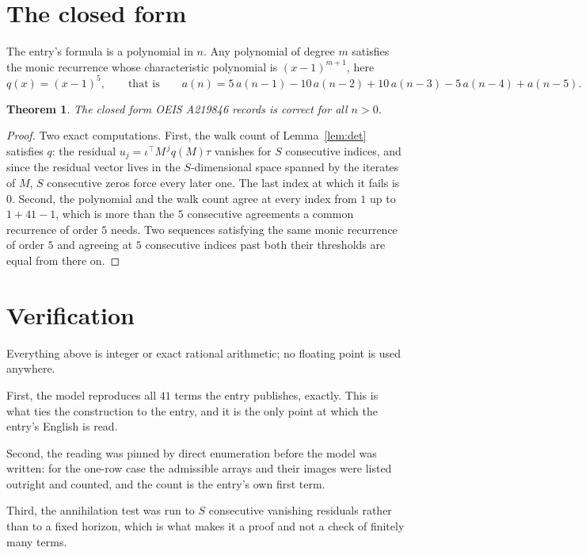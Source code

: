 \documentclass[11pt,a4paper]{article}
\theoremstyle{plain}
\newtheorem{theorem}{Theorem}
\theoremstyle{definition}
\begin{document}
\section{The closed form}

The entry's formula is a polynomial in $n$. Any polynomial of degree $m$ satisfies the monic
recurrence whose characteristic polynomial is $(x-1)^{m+1}$, here
\[
q(x)=(x-1)^{5},\qquad\text{that is}\qquad a(n)=5\,a(n-1) - 10\,a(n-2) + 10\,a(n-3) - 5\,a(n-4) + a(n-5).
\]

\begin{theorem}
The closed form OEIS A219846 records is correct for all $n>0$.
\end{theorem}

\begin{proof}
Two exact computations. First, the walk count of Lemma~\ref{lem:det} satisfies $q$: the
residual $u_j=\iota^{\!\top}M^{\,j}q(M)\tau$ vanishes for $S$ consecutive indices, and
since the residual vector lives in the $S$-dimensional space spanned by the iterates of $M$,
$S$ consecutive zeros force every later one. The last index at which it fails is $0$.
Second, the polynomial and the walk count agree at every index from $1$ up to
$1 + 41 - 1$, which is more than the $5$ consecutive agreements a
common recurrence of order $5$ needs. Two sequences satisfying the same monic recurrence
of order $5$ and agreeing at $5$ consecutive indices past both their thresholds are
equal from there on.
\end{proof}

\section{Verification}

Everything above is integer or exact rational arithmetic; no floating point is used anywhere.

First, the model reproduces all $41$ terms the entry publishes, exactly. This is what
ties the construction to the entry, and it is the only point at which the entry's English is
read.

Second, the reading was pinned by direct enumeration before the model was written: for the
one-row case the admissible arrays and their images were listed outright and counted, and the
count is the entry's own first term.

Third, the annihilation test was run to $S$ consecutive vanishing residuals rather than to a
fixed horizon, which is what makes it a proof and not a check of finitely many terms.
\end{document}
